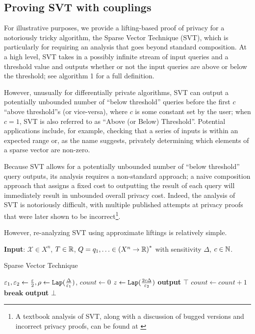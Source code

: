 \subsection{Proving SVT with couplings}

For illustrative purposes, we provide a lifting-based proof of privacy for a notoriously tricky algorithm, the Sparse Vector Technique (SVT), which is particularly for requiring an analysis that goes beyond standard composition. 
At a high level, SVT takes in a possibly infinite stream of input queries and a threshold value and outputs whether or not the input queries are above or below the threshold; see algorithm 1 for a full definition. 

However, unusually for differentially private algorithms, SVT can output a potentially unbounded number of ``below threshold'' queries before the first $c$ ``above threshold''s (or vice-versa), where $c$ is some constant set by the user; when $c=1$, SVT is also referred to as ``Above (or Below) Threshold''.
 Potential applications include, for example, checking that a series of inputs is within an expected range or, as the name suggests, privately determining which elements of a sparse vector are non-zero. 

Because SVT allows for a potentially unbounded number of ``below threshold'' query outputs, its analysis requires a non-standard approach; a naive composition approach that assigns a fixed cost to outputting the result of each query will immediately result in unbounded overall privacy cost. 
Indeed, the analysis of SVT is notoriously difficult, with multiple published attempts at privacy proofs that were later shown to be incorrect\footnote{A textbook analysis of SVT, along with a discussion of bugged versions and incorrect privacy proofs, can be found at \cite{lyuUnderstandingSparseVector2016a}}. 

However, re-analyzing SVT using approximate liftings is relatively simple.

\begin{algorithm}
    \hspace*{\algorithmicindent}\textbf{Input}: $\mathcal{X}\in X^n$, $T\in \mathbb{R}$, $Q=q_1, \ldots \in {(X^n\to \mathbb{R})}^*$ with sensitivity $\Delta$, $c\in \mathbb{N}$.
    \begin{algorithmic}[1]
        \caption{Sparse Vector Technique}\label{couplingAlg}
        \State $\varepsilon_1, \varepsilon_2 \gets \frac{\varepsilon}{2},
        \rho \gets \texttt{Lap}(\frac{\Delta}{\varepsilon_1})$, $count \gets 0$
			\State $z\gets \texttt{Lap}(\frac{2c\Delta}{\varepsilon_2})$
                \State\textbf{output} $\top$
                \State$count\gets count+1$
                    \State$\textbf{break}$
                \EndIf
            \Else
                \State\textbf{output} $\bot$
            \EndIf
		\EndFor
    \end{algorithmic}
\end{algorithm}


